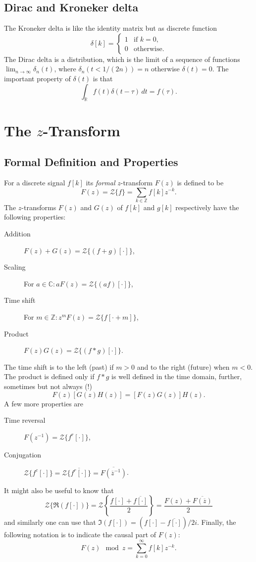 \subsection{Dirac and Kroneker delta}

The Kroneker delta is like the identity matrix but as discrete function
\[
	\delta[k] = \begin{cases}
		1 & \text{if } k = 0, \\
		0 & \text{otherwise}.
	\end{cases}
\]
The Dirac delta is a distribution, which
is the limit of a sequence of functions $\lim_{n \to \infty} \delta_n(t)$,
where $\delta_n(t < 1/(2n)) = n$ otherwise $\delta(t) = 0$. The important
property of $\delta(t)$ is that
\[
	\int_\mathbb{R} f(t) \delta(t - \tau) \, dt = f(\tau).
\]

\section{The $z$-Transform}

\subsection{Formal Definition and Properties}

For a discrete signal $f[k]$ its \emph{formal} $z$-transform $F(z) $ is
defined to be
\[
	F(z) = \mathcal{Z}\{f\} = \sum_{k\in\mathbb{Z}} f[k] z^{-k}.
\]
The $z$-transforms $F(z)$ and $G(z)$ of $f[k]$ and $g[k]$ respectively have
the following properties:
\begin{description}
	\item[Addition] $F(z) + G(z) = \mathcal{Z}\{(f + g)[\cdot]\}$,
	\item[Scaling] For $a \in \mathbb{C} : a F(z) = \mathcal{Z}\{(af)[\cdot]\}$,
	\item[Time shift] For $m \in \mathbb{Z} :
		z^m F(z) = \mathcal{Z}\{f[\cdot + m]\}$,
	\item[Product] $F(z) G(z) = \mathcal{Z}\{(f * g)[\cdot]\}$.
\end{description}
The time shift is to the left (past) if $m > 0$ and to the right (future) when
$m < 0$. The product is defined only if $f*g$ is well defined in the time
domain, further, sometimes but not always (!)
\[
	F(z)[G(z)H(z)] = [F(z)G(z)]H(z).
\] A few more properties are
\begin{description}
	\item[Time reversal] $F(z^{-1}) = \mathcal{Z}\{f^r[\cdot]\}$,
	\item[Conjugation] $\mathcal{Z}\{f^c[\cdot]\}
		= \mathcal{Z}\{\overline{f^r[\cdot]}\}
		= \overline{F(\overline{z}^{-1})}$.
\end{description}
It might also be useful to know that
\[
	\mathcal{Z}\{\Re{(f[\cdot])}\}
	= \mathcal{Z}\left\{\frac{f[\cdot] + \overline{f[\cdot]}}{2}\right\}
	= \frac{F(z) + \overline{F(\overline{z})}}{2}
\]
and similarly one can use that $\Im(f[\cdot]) = (f[\cdot] -
\overline{f[\cdot]})/2i$. Finally, the following notation is to indicate the
causal part of $F(z)$:
\[
	F(z) \mod z = \sum_{k=0}^\infty f[k] z^{-k}.
\]

